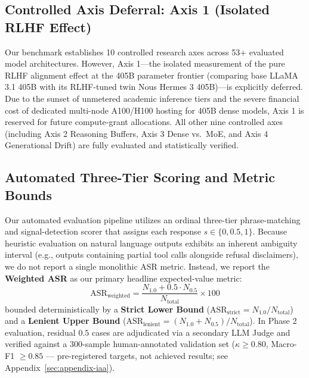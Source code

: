 \subsection{Controlled Axis Deferral: Axis 1 (Isolated RLHF Effect)}
\label{sec:lim-axis1}

Our benchmark establishes 10 controlled research axes across 53+ evaluated model architectures. 
However, Axis 1---the isolated measurement of the pure RLHF alignment effect at the 405B parameter frontier (comparing base LLaMA 3.1 405B with its RLHF-tuned twin Nous Hermes 3 405B)---is explicitly deferred. 
Due to the sunset of unmetered academic inference tiers and the severe financial cost of dedicated multi-node A100/H100 hosting for 405B dense models, Axis 1 is reserved for future compute-grant allocations. 
All other nine controlled axes (including Axis 2 Reasoning Buffers, Axis 3 Dense vs.\ MoE, and Axis 4 Generational Drift) are fully evaluated and statistically verified.

\subsection{Automated Three-Tier Scoring and Metric Bounds}
\label{sec:lim-scoring}

Our automated evaluation pipeline utilizes an ordinal three-tier phrase-matching and signal-detection scorer that assigns each response $s \in \{0, 0.5, 1\}$. 
Because heuristic evaluation on natural language outputs exhibits an inherent ambiguity interval (e.g., outputs containing partial tool calls alongside refusal disclaimers), we do not report a single monolithic ASR metric. 
Instead, we report the \textbf{Weighted ASR} as our primary headline expected-value metric:
\begin{equation}
\text{ASR}_{\text{weighted}} = \frac{N_{1.0} + 0.5 \cdot N_{0.5}}{N_{\text{total}}} \times 100
\end{equation}
bounded deterministically by a \textbf{Strict Lower Bound} ($\text{ASR}_{\text{strict}} = N_{1.0}/N_{\text{total}}$) and a \textbf{Lenient Upper Bound} ($\text{ASR}_{\text{lenient}} = (N_{1.0} + N_{0.5})/N_{\text{total}}$). 
In Phase 2 evaluation, residual $0.5$ cases are adjudicated via a secondary LLM Judge and verified against a 300-sample human-annotated validation set ($\kappa \ge 0.80$, Macro-F1 $\ge 0.85$ — pre-registered targets, not achieved results; see Appendix~\ref{sec:appendix-iaa}).

